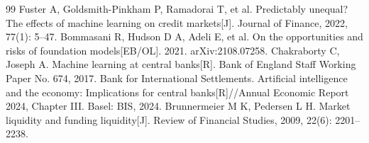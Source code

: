 \begin{thebibliography}{99}
 Fuster A, Goldsmith-Pinkham P, Ramadorai T, et al. Predictably unequal? The effects of machine learning on credit markets[J]. Journal of Finance, 2022, 77(1): 5--47.
 Bommasani R, Hudson D A, Adeli E, et al. On the opportunities and risks of foundation models[EB/OL]. 2021. arXiv:2108.07258.
 Chakraborty C, Joseph A. Machine learning at central banks[R]. Bank of England Staff Working Paper No. 674, 2017.
 Bank for International Settlements. Artificial intelligence and the economy: Implications for central banks[R]//Annual Economic Report 2024, Chapter III. Basel: BIS, 2024.
 Brunnermeier M K, Pedersen L H. Market liquidity and funding liquidity[J]. Review of Financial Studies, 2009, 22(6): 2201--2238.

\end{thebibliography}
